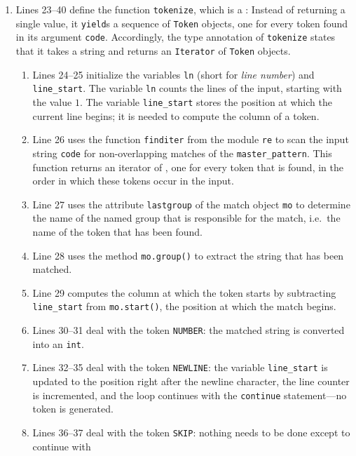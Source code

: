 \begin{enumerate}
\item Lines 23--40 define the function \texttt{tokenize}, which is a : Instead of
      returning a single value, it \texttt{yield}s a sequence of \texttt{Token} objects, one for every token
      found in its argument \texttt{code}.  Accordingly, the type annotation of \texttt{tokenize} states that
      it takes a string and returns an \texttt{Iterator} of \texttt{Token} objects.
      \begin{enumerate}
      \item Lines 24--25 initialize the variables \texttt{ln} (short for \emph{line number})
            and \texttt{line\_start}.  The variable \linebreak
            \texttt{ln} counts the lines of the input, starting with the value $1$.  The variable
            \texttt{line\_start} stores the position at which the current line begins; it is needed to compute
            the column of a token.
      \item Line 26 uses the function \texttt{finditer} from the module \texttt{re} to scan the input string
            \texttt{code} for non-overlapping matches of the \texttt{master\_pattern}.  This function returns
            an iterator of , one for every token that is found, in the order in which these
            tokens occur in the input.
      \item Line 27 uses the attribute \texttt{lastgroup} of the match object \texttt{mo} to determine the name
            of the named group that is responsible for the match, i.e.\ the name of the token that has been
            found.
      \item Line 28 uses the method \texttt{mo.group()} to extract the string that has been matched.
      \item Line 29 computes the column at which the token starts by subtracting \texttt{line\_start} from
            \texttt{mo.start()}, the position at which the match begins.
      \item Lines 30--31 deal with the token \texttt{NUMBER}: the matched string is converted into an
            \texttt{int}.
      \item Lines 32--35 deal with the token \texttt{NEWLINE}: the variable \texttt{line\_start} is updated to
            the position right after the newline character, the line counter is incremented, and the loop
            continues with the \texttt{continue} statement---no token is generated.
      \item Lines 36--37 deal with the token \texttt{SKIP}: nothing needs to be done except to continue with

\end{enumerate}
\end{enumerate}

